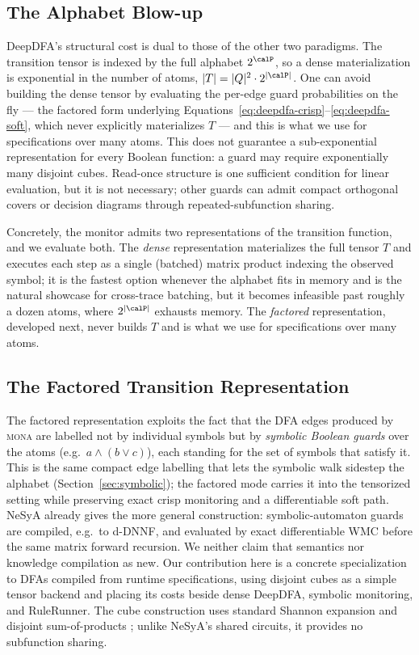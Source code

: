 \subsection{The Alphabet Blow-up}
\label{sec:deepdfa-alphabet}

DeepDFA's structural cost is dual to those of the other two paradigms. The transition tensor is indexed by the full alphabet $2^\calP$, so a dense materialization is exponential in the number of atoms, $|T| = |Q|^2 \cdot 2^{|\calP|}$. One can avoid building the dense tensor by evaluating the per-edge guard probabilities on the fly --- the factored form underlying Equations~\eqref{eq:deepdfa-crisp}--\eqref{eq:deepdfa-soft}, which never explicitly materializes $T$ --- and this is what we use for specifications over many atoms. This does not guarantee a sub-exponential representation for every Boolean function: a guard may require exponentially many disjoint cubes. Read-once structure is one sufficient condition for linear evaluation, but it is not necessary; other guards can admit compact orthogonal covers or decision diagrams through repeated-subfunction sharing.

Concretely, the monitor admits two representations of the transition function, and we evaluate both. The \emph{dense} representation materializes the full tensor $T$ and executes each step as a single (batched) matrix product indexing the observed symbol; it is the fastest option whenever the alphabet fits in memory and is the natural showcase for cross-trace batching, but it becomes infeasible past roughly a dozen atoms, where $2^{|\calP|}$ exhausts memory. The \emph{factored} representation, developed next, never builds $T$ and is what we use for specifications over many atoms.

\subsection{The Factored Transition Representation}
\label{sec:deepdfa-factored}

The factored representation exploits the fact that the DFA edges produced by \textsc{mona} are labelled not by individual symbols but by \emph{symbolic Boolean guards} over the atoms (e.g.\ $a \land (b \lor c)$), each standing for the set of symbols that satisfy it. This is the same compact edge labelling that lets the symbolic walk sidestep the alphabet (Section~\ref{sec:symbolic}); the factored mode carries it into the tensorized setting while preserving exact crisp monitoring and a differentiable soft path. NeSyA \cite{NesyA} already gives the more general construction: symbolic-automaton guards are compiled, e.g.\ to d-DNNF, and evaluated by exact differentiable WMC before the same matrix forward recursion. We neither claim that semantics nor knowledge compilation as new. Our contribution here is a concrete specialization to DFAs compiled from \ltlf runtime specifications, using disjoint cubes as a simple tensor backend and placing its costs beside dense DeepDFA, symbolic monitoring, and RuleRunner. The cube construction uses standard Shannon expansion and disjoint sum-of-products \cite{darwiche2002knowledge}; unlike NeSyA's shared circuits, it provides no subfunction sharing.

